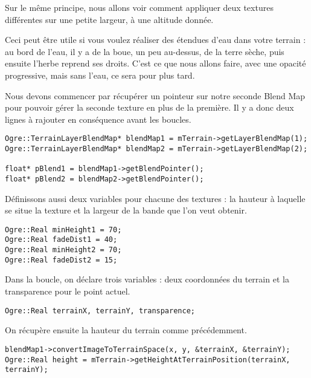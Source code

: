 Sur le m\^eme principe, nous allons voir comment appliquer deux textures diff\'erentes sur une petite largeur, \`a une altitude donn\'ee.

Ceci peut \^etre utile si vous voulez r\'ealiser des \'etendues d'eau dans votre terrain : au bord de l'eau, il y a de la boue, un peu au-dessus, de la terre s\`eche, puis ensuite l'herbe reprend ses droits. C'est ce que nous allons faire, avec une opacit\'e progressive, mais sans l'eau, ce sera pour plus tard.

Nous devons commencer par r\'ecup\'erer un pointeur sur notre seconde Blend Map pour pouvoir g\'erer la seconde texture en plus de la premi\`ere. Il y a donc deux lignes \`a rajouter en cons\'equence avant les boucles.




\begin{lstlisting}[caption={R\'ecup\'eration des Blend Map pour le premier et le second terrain}]
Ogre::TerrainLayerBlendMap* blendMap1 = mTerrain->getLayerBlendMap(1);
Ogre::TerrainLayerBlendMap* blendMap2 = mTerrain->getLayerBlendMap(2);

float* pBlend1 = blendMap1->getBlendPointer();
float* pBlend2 = blendMap2->getBlendPointer();
\end{lstlisting}

D\'efinissons aussi deux variables pour chacune des textures : la hauteur \`a laquelle se situe la texture et la largeur de la bande que l'on veut obtenir.

\begin{lstlisting}[caption={}]
Ogre::Real minHeight1 = 70;
Ogre::Real fadeDist1 = 40;
Ogre::Real minHeight2 = 70;
Ogre::Real fadeDist2 = 15;
\end{lstlisting}

Dans la boucle, on d\'eclare trois variables : deux coordonn\'ees du terrain et la transparence pour le point actuel.

\begin{lstlisting}[caption={}]
Ogre::Real terrainX, terrainY, transparence;
\end{lstlisting}

On r\'ecup\`ere ensuite la hauteur du terrain comme pr\'ec\'edemment.

\begin{lstlisting}[caption={}]
blendMap1->convertImageToTerrainSpace(x, y, &terrainX, &terrainY);
Ogre::Real height = mTerrain->getHeightAtTerrainPosition(terrainX, terrainY);
\end{lstlisting}

